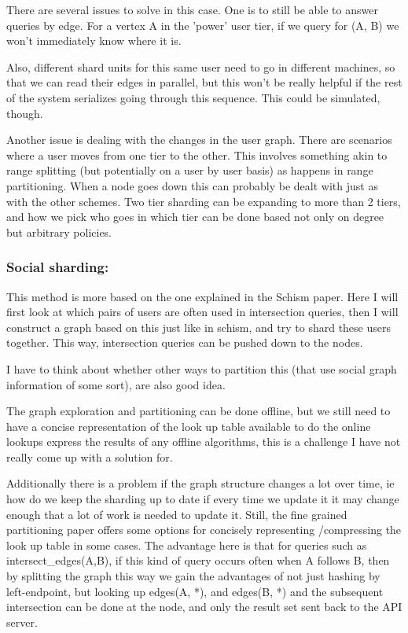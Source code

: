 \documentclass{article}
\begin{document}
There are several issues to solve in this case. One is to still be able to answer queries by edge. For a vertex A in the 'power' user tier, if we query for (A, B) we won't immediately know where it is.   

Also, different shard units for this same user need to go in different machines, so that we can read their edges in parallel, but this won't be really helpful if the rest of the system serializes going through this sequence. This could be simulated, though.

 Another issue is dealing with the changes in the user graph. There are scenarios where a user moves from one tier to the other. This involves something akin to range splitting (but potentially on a user by user basis) as happens in range partitioning.   When a node goes down this can probably be dealt with just as with the other schemes.  Two tier sharding can be expanding to more than 2 tiers, and how we pick who goes in which tier can be done based not only on degree but arbitrary policies.  

\subsubsection{Social sharding:}
This method is more based on the one explained in the Schism paper. Here I will first look at which pairs of users are often used in intersection queries, then I will construct a graph based on this just like in schism, and try to shard these users together. This way, intersection queries can be pushed down to the nodes.

I have to think about whether other ways to partition this (that use social graph information of some sort), are also  good idea.

The graph exploration and partitioning can be done offline, but we still need to have a concise representation of the look up table available to do the online lookups express the results of any offline algorithms, this is a challenge I have not really come up with a solution for. 

Additionally there is a problem if the graph structure changes a lot over time, ie how do we keep the sharding up to date if every time we update it it may change enough that a lot of work is needed to update it.  Still, the fine grained partitioning paper offers some options for concisely representing /compressing the look up table in some cases. The advantage here is that for queries such as intersect\_edges(A,B), if this kind of query occurs often when A follows B, then by splitting the graph this way we gain the advantages of not just hashing by left-endpoint, but looking up edges(A, *), and edges(B, *) and the subsequent intersection can be done at the node, and only the result set sent back to the API server.
\end{document}
